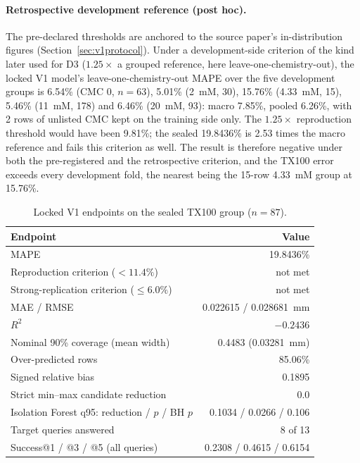 \documentclass[11pt,a4paper]{article}
\newcommand{\tox}{TX100}
\begin{document}
\paragraph{Retrospective development reference (post hoc).} The pre-declared
thresholds are anchored to the source paper's in-distribution figures
(Section~\ref{sec:v1protocol}). Under a development-side criterion of the kind later
used for D3 ($1.25\times$ a grouped reference, here leave-one-chemistry-out), the locked V1 model's leave-one-chemistry-out MAPE over the five
development groups is 6.54\% (CMC 0, $n=63$), 5.01\% (2~mM, 30), 15.76\%
(4.33~mM, 15), 5.46\% (11~mM, 178) and 6.46\% (20~mM, 93): macro 7.85\%,
pooled 6.26\%, with 2 rows of unlisted CMC kept on the training side only.
The $1.25\times$ reproduction threshold would have been 9.81\%; the sealed
19.8436\% is 2.53 times the macro reference and fails this criterion as
well. The result is therefore negative under both the pre-registered and the
retrospective criterion, and the \tox{} error exceeds every development fold,
the nearest being the 15-row 4.33~mM group at 15.76\%.

\begin{table}[t]
\centering\small
\caption{Locked V1 endpoints on the sealed \tox{} group ($n=87$).}
\label{tab:v1}
\begin{tabular}{lr}
\toprule
Endpoint & Value \\
\midrule
MAPE & 19.8436\% \\
Reproduction criterion ($<11.4\%$) & not met \\
Strong-replication criterion ($\le 6.0\%$) & not met \\
MAE / RMSE & 0.022615 / 0.028681~mm \\
$R^2$ & $-0.2436$ \\
Nominal 90\% coverage (mean width) & 0.4483 (0.03281~mm) \\
Over-predicted rows & 85.06\% \\
Signed relative bias & 0.1895 \\
Strict min--max candidate reduction & 0.0 \\
Isolation Forest q95: reduction / $p$ / BH $p$ & 0.1034 / 0.0266 / 0.106 \\
Target queries answered & 8 of 13 \\
Success@1 / @3 / @5 (all queries) & 0.2308 / 0.4615 / 0.6154 \\
\bottomrule
\end{tabular}
\end{table}
\end{document}

